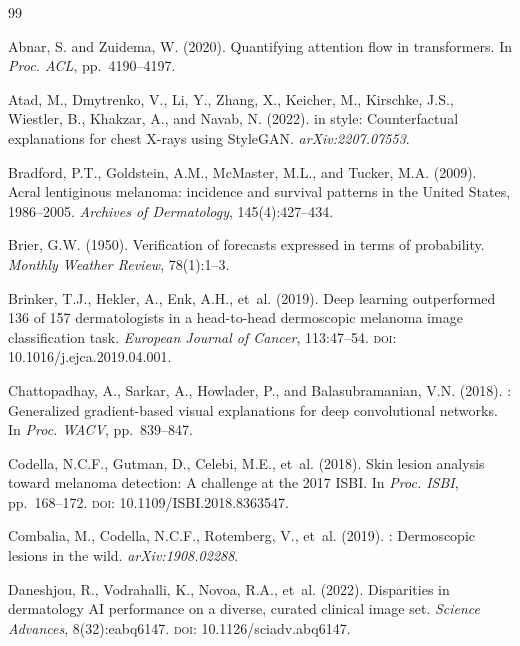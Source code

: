 \documentclass[12pt, a4paper]{article}
\begin{document}
\begin{thebibliography}{99}

Abnar, S. and Zuidema, W. (2020).
\newblock Quantifying attention flow in transformers.
\newblock In \emph{Proc. ACL}, pp.\ 4190--4197.

Atad, M., Dmytrenko, V., Li, Y., Zhang, X., Keicher, M., Kirschke, J.S., Wiestler, B., Khakzar, A., and Navab, N. (2022).
 in style: Counterfactual explanations for chest X-rays using StyleGAN.
\newblock \emph{arXiv:2207.07553}.

Bradford, P.T., Goldstein, A.M., McMaster, M.L., and Tucker, M.A. (2009).
\newblock Acral lentiginous melanoma: incidence and survival patterns in the {United States}, 1986--2005.
\newblock \emph{Archives of Dermatology}, 145(4):427--434.

Brier, G.W. (1950).
\newblock Verification of forecasts expressed in terms of probability.
\newblock \emph{Monthly Weather Review}, 78(1):1--3.

Brinker, T.J., Hekler, A., Enk, A.H., et~al. (2019).
\newblock Deep learning outperformed 136 of 157 dermatologists in a head-to-head dermoscopic melanoma image classification task.
\newblock \emph{European Journal of Cancer}, 113:47--54.
\newblock \textsc{doi}: 10.1016/j.ejca.2019.04.001.

Chattopadhay, A., Sarkar, A., Howlader, P., and Balasubramanian, V.N. (2018).
: Generalized gradient-based visual explanations for deep convolutional networks.
\newblock In \emph{Proc. WACV}, pp.\ 839--847.

Codella, N.C.F., Gutman, D., Celebi, M.E., et~al. (2018).
\newblock Skin lesion analysis toward melanoma detection: A challenge at the 2017 {ISBI}.
\newblock In \emph{Proc. ISBI}, pp.\ 168--172.
\newblock \textsc{doi}: 10.1109/ISBI.2018.8363547.

Combalia, M., Codella, N.C.F., Rotemberg, V., et~al. (2019).
: Dermoscopic lesions in the wild.
\newblock \emph{arXiv:1908.02288}.

Daneshjou, R., Vodrahalli, K., Novoa, R.A., et~al. (2022).
\newblock Disparities in dermatology {AI} performance on a diverse, curated clinical image set.
\newblock \emph{Science Advances}, 8(32):eabq6147.
\newblock \textsc{doi}: 10.1126/sciadv.abq6147.


\end{thebibliography}
\end{document}
